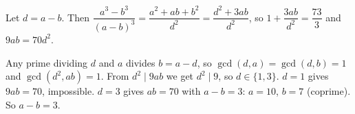 Let $d=a-b$. Then $\dfrac{a^3-b^3}{(a-b)^3}=\dfrac{a^2+ab+b^2}{d^2}=\dfrac{d^2+3ab}{d^2}$, so $1+\dfrac{3ab}{d^2}=\dfrac{73}3$ and $9ab=70d^2$.

Any prime dividing $d$ and $a$ divides $b=a-d$, so $\gcd(d,a)=\gcd(d,b)=1$ and $\gcd(d^2,ab)=1$. From $d^2\mid9ab$ we get $d^2\mid9$, so $d\in\{1,3\}$. $d=1$ gives $9ab=70$, impossible. $d=3$ gives $ab=70$ with $a-b=3$: $a=10$, $b=7$ (coprime). So $a-b=\boxed{3}$.
